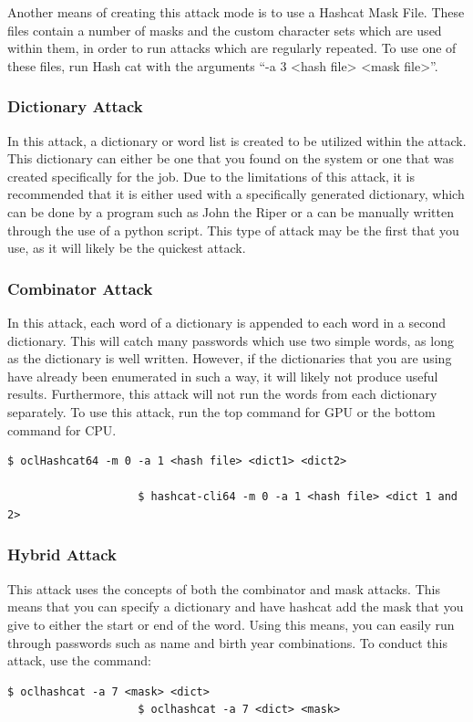 				Another means of creating this attack mode is to use a Hashcat Mask File. 
				These files contain a number of masks and the custom character sets which are used within them, in order to run attacks which are regularly repeated. 
				To use one of these files, run Hash cat with the arguments ``-a 3 <hash file> <mask file>''.

			\subsubsection{Dictionary Attack}
				In this attack, a dictionary or word list is created to be utilized within the attack. 
				This dictionary can either be one that you found on the system or one that was created specifically for the job. 
				Due to the limitations of this attack, it is recommended that it is either used with a specifically generated dictionary, which can be done by a program such as John the Riper or
				a can be manually written through the use of a python script. 
				This type of attack may be the first that you use, as it will likely be the quickest attack. 
			\subsubsection{Combinator Attack}
				In this attack, each word of a dictionary is appended to each word in a second dictionary. 
				This will catch many passwords which use two simple words, as long as the dictionary is well written. 
				However, if the dictionaries that you are using have already been enumerated in such a way, it will likely not produce useful results. 
				Furthermore, this attack will not run the words from each dictionary separately. 
				To use this attack, run the top command for GPU or the bottom command for CPU. 
				\begin{lstlisting}[style=CLI]
					$ oclHashcat64 -m 0 -a 1 <hash file> <dict1> <dict2>
					
					$ hashcat-cli64 -m 0 -a 1 <hash file> <dict 1 and 2>
				\end{lstlisting}
			\subsubsection{Hybrid Attack}
				This attack uses the concepts of both the combinator and mask attacks. 
				This means that you can specify a dictionary and have hashcat add the mask that you give to either the start or end of the word. 
				Using this means, you can easily run through passwords such as name and birth year combinations. 
				To conduct this attack, use the command:
				\begin{lstlisting}[style=CLI]
					$ oclhashcat -a 7 <mask> <dict>
					$ oclhashcat -a 7 <dict> <mask>
				\end{lstlisting}
				
